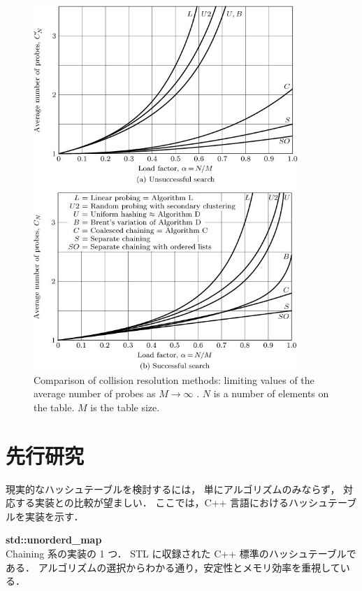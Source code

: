 \begin{figure} %
  \centering
  \includegraphics[width=10cm]{./fig/taocp_v3_fig44.png}
  \caption{
    Comparison of collision resolution methods: limiting values of the average number of probes as $M \rightarrow \infty$ \citep{knuth1998}.
    $N$ is a number of elements on the table. $M$ is the table size.
  }
  \label{fig_taocp_v3_fig44}
\end{figure}


\section{先行研究}
現実的なハッシュテーブルを検討するには，
単にアルゴリズムのみならず，
対応する実装との比較が望ましい．
ここでは，C++ 言語におけるハッシュテーブルを実装を示す．
\leavevmode \newline

{\bf std::unorderd\_map}
\samepage \\ \indent
Chaining 系の実装の 1 つ．
STL に収録された C++ 標準のハッシュテーブルである．
アルゴリズムの選択からわかる通り，安定性とメモリ効率を重視している．
\\

